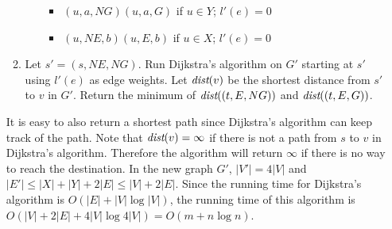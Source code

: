 \documentclass[11pt]{article}
\begin{document}
\begin{solution}
\begin{enumerate}[(a)]
\begin{enumerate}[(1)]
\begin{itemize}
\begin{itemize}
\item $(u, a, NG)(u, a, G)$ if $u\in Y$; $l'(e)=0$
\item $(u, NE, b)(u, E, b)$ if $u\in X$; $l'(e)=0$
\end{itemize}
\end{itemize}
\item Let $s'=(s,NE,NG)$. Run Dijkstra's algorithm on $G'$ starting at $s'$ using $l'(e)$ as edge weights. Let $\emph{dist}(v)$ be the shortest distance from $s'$ to $v$ in $G'$. Return the minimum of $\emph{dist}((t,E,NG))$ and $\emph{dist}((t,E,G))$.
\end{enumerate}
It is easy to also return a shortest path since Dijkstra's algorithm can keep track of the path. Note that $\emph{dist}(v)=\infty$ if there is not a path from $s$ to $v$ in Dijkstra's algorithm. Therefore the algorithm will return $\infty$ if there is no way to reach the destination. In the new graph $G'$, $|V'|=4|V|$ and $|E'|\le |X|+|Y|+2|E| \le |V|+2|E|$. Since the running time for Dijkstra's algorithm is $O(|E|+|V|\log{|V|})$, the running time of this algorithm is $O(|V|+2|E|+4|V|\log{4|V|})=O(m+n\log{n})$.


\end{enumerate}
\end{solution}
\end{document}
